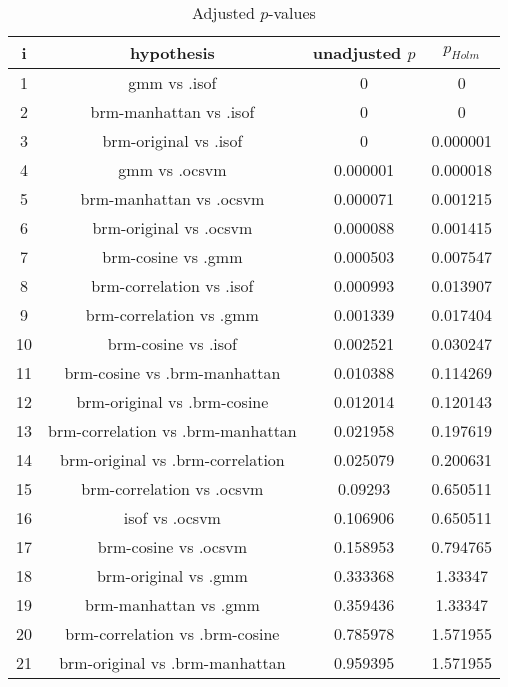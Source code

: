 \documentclass[a4paper,10pt]{article}
\begin{document}
\begin{landscape}
\begin{table}[!htp]
\centering\scriptsize
\begin{tabular}{cccc}
i&hypothesis&unadjusted $p$&$p_{Holm}$\\
\hline1&gmm vs .isof&0&0\\
2&brm-manhattan vs .isof&0&0\\
3&brm-original vs .isof&0&0.000001\\
4&gmm vs .ocsvm&0.000001&0.000018\\
5&brm-manhattan vs .ocsvm&0.000071&0.001215\\
6&brm-original vs .ocsvm&0.000088&0.001415\\
7&brm-cosine vs .gmm&0.000503&0.007547\\
8&brm-correlation vs .isof&0.000993&0.013907\\
9&brm-correlation vs .gmm&0.001339&0.017404\\
10&brm-cosine vs .isof&0.002521&0.030247\\
11&brm-cosine vs .brm-manhattan&0.010388&0.114269\\
12&brm-original vs .brm-cosine&0.012014&0.120143\\
13&brm-correlation vs .brm-manhattan&0.021958&0.197619\\
14&brm-original vs .brm-correlation&0.025079&0.200631\\
15&brm-correlation vs .ocsvm&0.09293&0.650511\\
16&isof vs .ocsvm&0.106906&0.650511\\
17&brm-cosine vs .ocsvm&0.158953&0.794765\\
18&brm-original vs .gmm&0.333368&1.33347\\
19&brm-manhattan vs .gmm&0.359436&1.33347\\
20&brm-correlation vs .brm-cosine&0.785978&1.571955\\
21&brm-original vs .brm-manhattan&0.959395&1.571955\\
\hline
\end{tabular}
\caption{Adjusted $p$-values}
\end{table}

\end{landscape}
\end{document}
